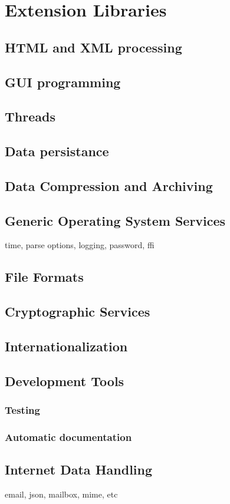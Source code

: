 \documentclass[10pt,english]{book}
\begin{document}
\part{Extension Libraries}
\label{part:libraries}


\chapter{HTML and XML processing}


\chapter{GUI programming}


\chapter{Threads}


\chapter{Data persistance}


\chapter{Data Compression and Archiving}


\chapter{Generic Operating System Services}

time, parse options, logging, password, ffi


\chapter{File Formats}


\chapter{Cryptographic Services}


\chapter{Internationalization}


\chapter{Development Tools}

\section{Testing}

\section{Automatic documentation}


\chapter{Internet Data Handling}

email, json, mailbox, mime, etc

\printindex
\end{document}
